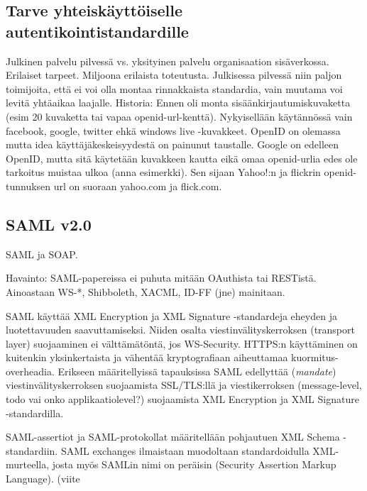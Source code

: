\documentclass[finnish,gradu]{tktltiki}
\begin{document}
  \subsection{Tarve yhteiskäyttöiselle autentikointistandardille} %
  \label{sub:tarve_yhteiskäyttöiselle_autentikointistandardille}
  Julkinen palvelu pilvessä vs. yksityinen palvelu organisaation sisäverkossa. Erilaiset tarpeet. Miljoona erilaista toteutusta. Julkisessa pilvessä niin paljon toimijoita, että ei voi olla montaa rinnakkaista standardia, vain muutama voi levitä yhtäaikaa laajalle. Historia: Ennen oli monta sisäänkirjautumiskuvaketta (esim 20 kuvaketta tai vapaa openid-url-kenttä). Nykyisellään käytännössä vain facebook, google, twitter ehkä windows live -kuvakkeet. OpenID on olemassa mutta idea käyttäjäkeskeisyydestä on painunut taustalle. Google on edelleen OpenID, mutta sitä käytetään kuvakkeen kautta eikä omaa openid-urlia edes ole tarkoitus muistaa ulkoa (anna esimerkki). Sen sijaan Yahoo!:n ja flickrin openid-tunnuksen url on suoraan yahoo.com ja flick.com.



  \subsection{SAML v2.0} %
  \label{sub:saml_v2_0}
  SAML ja SOAP.

  Havainto: SAML-papereissa ei puhuta mitään OAuthista tai RESTistä. Ainoastaan WS-*, Shibboleth, XACML, ID-FF (jne) mainitaan.

  SAML käyttää XML Encryption ja XML Signature -standardeja eheyden ja luotettavuuden saavuttamiseksi.
  Niiden osalta viestinvälityskerroksen (transport layer) suojaaminen ei välttämätöntä, jos WS-Security.
  HTTPS:n käyttäminen on kuitenkin yksinkertaista ja vähentää kryptografiaan aiheuttamaa kuormitus-overheadia.
  Erikseen määritellyissä tapauksissa SAML edellyttää (\emph{mandate}) viestinvälityskerroksen suojaamista SSL/TLS:llä ja viestikerroksen (message-level, todo vai onko applikaatiolevel?) suojaamista XML Encryption ja XML Signature -standardilla.

  SAML-assertiot ja SAML-protokollat määritellään pohjautuen XML Schema -standardiin.
  SAML exchanges ilmaistaan muodoltaan standardoidulla XML-murteella, josta myös SAMLin nimi on peräisin (Security Assertion Markup Language). (viite
\end{document}
